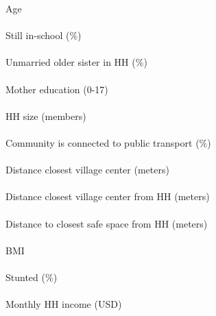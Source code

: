 Age \\
\\
Still in-school ($\%$) \\
\\
Unmarried older sister in HH ($\%$) \\
\\
Mother education (0-17) \\
\\
HH size (members) \\
\\
Community is connected to public transport ($\%$) \\
\\
Distance closest village center (meters)\\
\\
Distance closest village center from HH (meters) \\
\\
Distance to closest safe space from HH (meters) \\
\\
BMI \\
\\
Stunted ($\%$) \\
\\
Monthly HH income (USD) \\
\\